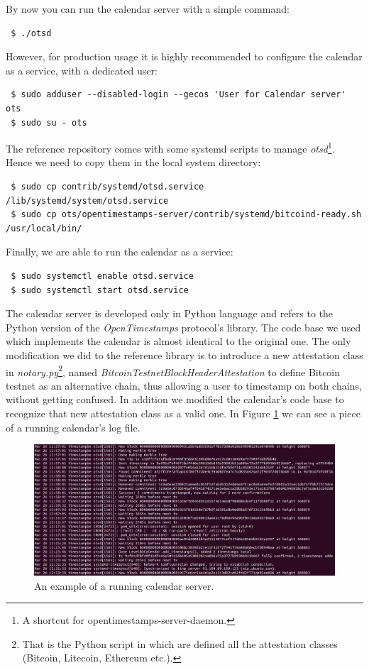 \bigskip
\noindent
By now you can run the calendar server with a simple command:
\begin{lstlisting}
 $ ./otsd
\end{lstlisting}

\bigskip
\noindent
However, for production usage it is highly recommended to configure the calendar as a service, with a dedicated user:
\begin{lstlisting}
 $ sudo adduser --disabled-login --gecos 'User for Calendar server' ots
 $ sudo su - ots
\end{lstlisting}

\bigskip
\noindent
The reference repository comes with some systemd scripts to manage \textit{otsd}\textup{\footnote{A shortcut for opentimestamps-server-daemon.}}. Hence we need to copy them in the local system directory:
\begin{lstlisting}
 $ sudo cp contrib/systemd/otsd.service /lib/systemd/system/otsd.service
 $ sudo cp ots/opentimestamps-server/contrib/systemd/bitcoind-ready.sh /usr/local/bin/
\end{lstlisting}

\bigskip
\noindent
Finally, we are able to run the calendar as a service:
\begin{lstlisting}
 $ sudo systemctl enable otsd.service
 $ sudo systemctl start otsd.service
\end{lstlisting}

\bigskip
\noindent
The calendar server is developed only in Python language and refers to the Python version of the \textit{OpenTimestamps} protocol's library. The code base we used which implements the calendar is almost identical to the original one. The only modification we did to the reference library is to introduce a new attestation class in \textit{notary.py}\textup{\footnote{That is the Python script in which are defined all the attestation classes (Bitcoin, Litecoin, Ethereum etc.).}}, named \textit{BitcoinTestnetBlockHeaderAttestation} to define Bitcoin testnet as an alternative chain, thus allowing a user to timestamp on both chains, without getting confused. In addition we modified the calendar's code base to recognize that new attestation class as a valid one. In Figure \ref{fig:backend} we can see a piece of a running calendar's log file.

\begin{figure}[h!]
    \centering
	\includegraphics[width=1\linewidth]{Images/backend.png}
	\caption{An example of a running calendar server.}
	\label{fig:backend}
\end{figure}

